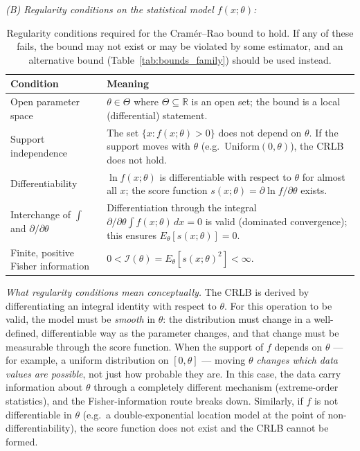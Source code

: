 \documentclass[11pt, a4paper]{article}
\begin{document}
\medskip
\noindent\textit{(B) Regularity conditions on the statistical model $f(x;\theta)$:}

\begin{table}[h]
\centering
\caption{Regularity conditions required for the Cram\'er--Rao bound to hold.
If any of these fails, the bound may not exist or may be violated by some
estimator, and an alternative bound (Table~\ref{tab:bounds_family}) should
be used instead.}
\label{tab:regularity}
\renewcommand{\arraystretch}{1.4}
\begin{tabular}{p{4.2cm} p{9.0cm}}
\hline
\textbf{Condition} & \textbf{Meaning} \\
\hline
Open parameter space &
$\theta \in \Theta$ where $\Theta \subseteq \mathbb{R}$ is an open set;
the bound is a local (differential) statement. \\
Support independence &
The set $\{x : f(x;\theta)>0\}$ does not depend on $\theta$.
If the support moves with $\theta$ (e.g.\ Uniform$(0,\theta)$),
the CRLB does not hold. \\
Differentiability &
$\ln f(x;\theta)$ is differentiable with respect to $\theta$ for
almost all $x$; the score function
$s(x;\theta) = \partial\ln f/\partial\theta$ exists. \\
Interchange of $\int$ and $\partial/\partial\theta$ &
Differentiation through the integral
$\partial/\partial\theta\!\int\! f(x;\theta)\,dx = 0$
is valid (dominated convergence); this ensures
$E_\theta[s(x;\theta)] = 0$. \\
Finite, positive Fisher information &
$0 < \mathcal{I}(\theta) = E_\theta[s(x;\theta)^2] < \infty$. \\
\hline
\end{tabular}
\end{table}

\medskip
\noindent\textit{What regularity conditions mean conceptually.}
The CRLB is derived by differentiating an integral identity with respect to $\theta$.
For this operation to be valid, the model must be \emph{smooth} in $\theta$: the
distribution must change in a well-defined, differentiable way as the parameter
changes, and that change must be measurable through the score function.
When the support of $f$ depends on $\theta$ --- for example, a uniform distribution
on $[0,\theta]$ --- moving $\theta$ \emph{changes which data values are possible},
not just how probable they are.
In this case, the data carry information about $\theta$ through a completely
different mechanism (extreme-order statistics), and the Fisher-information route
breaks down.
Similarly, if $f$ is not differentiable in $\theta$ (e.g.\ a double-exponential
location model at the point of non-differentiability), the score function does not
exist and the CRLB cannot be formed.
\end{document}
